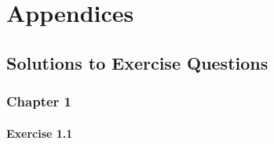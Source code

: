 \documentclass[11pt,fleqn]{book} %
\begin{document}

\part{Appendices}

\chapter*{Solutions to Exercise Questions}

\section*{Chapter 1}

\subsection*{Exercise 1.1}
\end{document}
